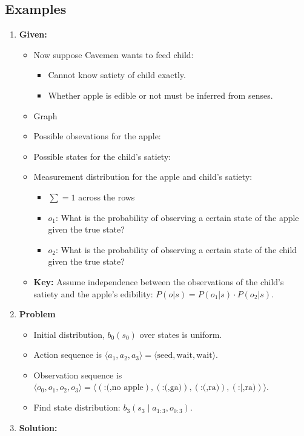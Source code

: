 \subsection{Examples}
\begin{example}
    \begin{enumerate}
        \item \textbf{Given:}
        \begin{itemize}
            \item Now suppose Cavemen wants to feed child: 
            \begin{itemize}
                \item Cannot know satiety of child exactly. 
                \item Whether apple is edible or not must be inferred from senses. 
            \end{itemize}
            \item Graph 
            \item Possible obsevations for the apple: 
            \item Possible states for the child's satiety:
            \item Measurement distribution for the apple and child's satiety:
            \begin{itemize}
                \item $\sum = 1$ across the rows
                \item $o_1$: What is the probability of observing a certain state of the apple given the true state?
                \item $o_2$: What is the probability of observing a certain state of the child given the true state?
            \end{itemize}
            \item \textbf{Key:} Assume independence between the observations of the child's satiety and the apple's edibility: $P(o | s) = P(o_1 | s) \cdot P(o_2 | s)$.
        \end{itemize}
        \item \textbf{Problem}
        \begin{itemize}
            \item Initial distribution, $b_0(s_0)$ over states is uniform. 
            \item Action sequence is $\langle a_1, a_2, a_3 \rangle = \langle \text{seed}, \text{wait}, \text{wait} \rangle$.
            \item Observation sequence is $\langle o_0, o_1, o_2, o_3 \rangle = \langle \left(\text{:(,no apple}\right), \left(\text{:(,ga)}\right), \left(\text{:(,ra)}\right), \left(\text{:|,ra)}\right) \rangle$.
            \item Find state distribution: $b_3 (s_3 \mid a_{1:3}, o_{0:3})$.
        \end{itemize}
        \item \textbf{Solution:}
    \end{enumerate}
\end{example}
